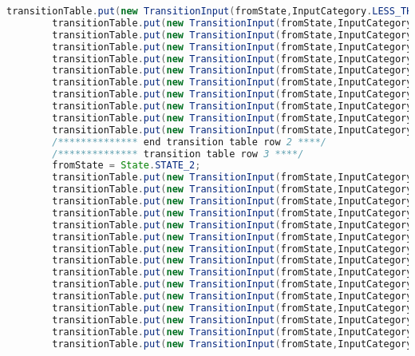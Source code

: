 \begin{lstlisting}[basicstyle=\miniscule,language=Java,caption=Implementation of transition table,label=listing:transition table]
		transitionTable.put(new TransitionInput(fromState,InputCategory.LESS_THAN), State.STATE_2);
		transitionTable.put(new TransitionInput(fromState,InputCategory.GREATER_THAN), State.STATE_2);
		transitionTable.put(new TransitionInput(fromState,InputCategory.PLUS), State.STATE_2);
		transitionTable.put(new TransitionInput(fromState,InputCategory.HYPHEN_MINUS), State.STATE_2);
		transitionTable.put(new TransitionInput(fromState,InputCategory.EQUAL), State.STATE_2);
		transitionTable.put(new TransitionInput(fromState,InputCategory.EXCLAMATION_MARK), State.STATE_2);
		transitionTable.put(new TransitionInput(fromState,InputCategory.DOT), State.STATE_2);
		transitionTable.put(new TransitionInput(fromState,InputCategory.SINGLE_QUOTE), State.STATE_2);
		transitionTable.put(new TransitionInput(fromState,InputCategory.PUNCT), State.STATE_2);
		transitionTable.put(new TransitionInput(fromState,InputCategory.OTHER_PRINTABLE), State.STATE_2);
		transitionTable.put(new TransitionInput(fromState,InputCategory.LINE_FEED), State.STATE_ERROR);
		/************** end transition table row 2 ****/
		/************** transition table row 3 ****/
		fromState = State.STATE_2;
		transitionTable.put(new TransitionInput(fromState,InputCategory.LETTER), State.STATE_ERROR);
		transitionTable.put(new TransitionInput(fromState,InputCategory.DIGIT), State.STATE_ERROR);
		transitionTable.put(new TransitionInput(fromState,InputCategory.UNDERSCORE), State.STATE_ERROR);
		transitionTable.put(new TransitionInput(fromState,InputCategory.SLASH_DIVIDE), State.STATE_ERROR);
		transitionTable.put(new TransitionInput(fromState,InputCategory.ASTERISK), State.STATE_ERROR);
		transitionTable.put(new TransitionInput(fromState,InputCategory.LESS_THAN), State.STATE_ERROR);
		transitionTable.put(new TransitionInput(fromState,InputCategory.GREATER_THAN), State.STATE_ERROR);
		transitionTable.put(new TransitionInput(fromState,InputCategory.PLUS), State.STATE_ERROR);
		transitionTable.put(new TransitionInput(fromState,InputCategory.HYPHEN_MINUS), State.STATE_ERROR);
		transitionTable.put(new TransitionInput(fromState,InputCategory.EQUAL), State.STATE_ERROR);
		transitionTable.put(new TransitionInput(fromState,InputCategory.EXCLAMATION_MARK), State.STATE_ERROR);
		transitionTable.put(new TransitionInput(fromState,InputCategory.DOT), State.STATE_ERROR);
		transitionTable.put(new TransitionInput(fromState,InputCategory.SINGLE_QUOTE), State.STATE_3);
		transitionTable.put(new TransitionInput(fromState,InputCategory.PUNCT), State.STATE_ERROR);
		transitionTable.put(new TransitionInput(fromState,InputCategory.OTHER_PRINTABLE), State.STATE_ERROR);

\end{lstlisting}
